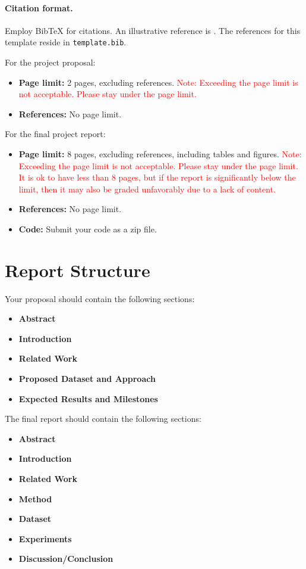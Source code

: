 \documentclass{article}
\begin{document}
\paragraph{Citation format.} Employ BibTeX for citations. An illustrative reference is \cite{vaswani2017attention}. The references for this template reside in \texttt{template.bib}.

For the project proposal:
\begin{itemize}
  \item \textbf{Page limit:} 2 pages, excluding references. \textcolor{red}{Note: Exceeding the page limit is not acceptable. Please stay under the page limit.}
  \item \textbf{References:} No page limit.
\end{itemize}

For the final project report:
\begin{itemize}
  \item \textbf{Page limit:} 8 pages, excluding references, including tables and figures. \textcolor{red}{Note: Exceeding the page limit is not acceptable. Please stay under the page limit. It is ok to have less than 8 pages, but if the report is significantly below the limit, then it may also be graded unfavorably due to a lack of content.}
  \item \textbf{References:} No page limit.
  \item \textbf{Code:} Submit your code as a zip file.
\end{itemize}

\section{Report Structure}
Your proposal should contain the following sections:
\begin{itemize}
  \item \textbf{Abstract}
  \item \textbf{Introduction}
  \item \textbf{Related Work}
  \item \textbf{Proposed Dataset and Approach}
  \item \textbf{Expected Results and Milestones}
\end{itemize}

The final report should contain the following sections:
\begin{itemize}
  \item \textbf{Abstract}
  \item \textbf{Introduction}
  \item \textbf{Related Work}
  \item \textbf{Method}
  \item \textbf{Dataset}
  \item \textbf{Experiments}
  \item \textbf{Discussion/Conclusion}
\end{itemize}
\end{document}
